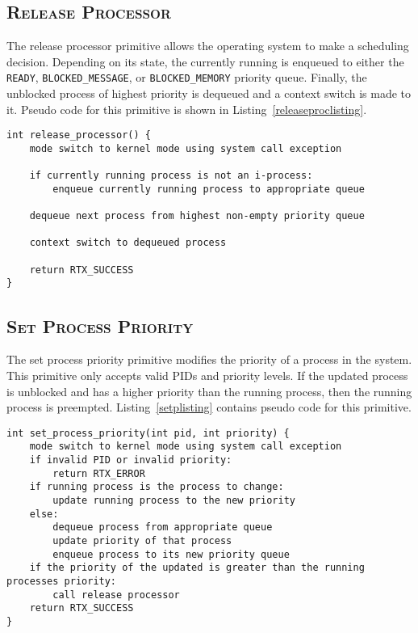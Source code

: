 \documentclass[oneside]{report}
\begin{document}
\subsection{\textsc{Release Processor}}
The release processor primitive allows the operating system to make a
scheduling decision. Depending on its state, the currently running is
enqueued to either the \texttt{READY}, \texttt{BLOCKED\_MESSAGE}, or
\texttt{BLOCKED\_MEMORY} priority queue. Finally, the unblocked process
of highest priority is dequeued and a context switch is made to it. Pseudo code 
for this primitive is shown in Listing~\ref{releaseproclisting}.

\begin{lstlisting}
int release_processor() {
    mode switch to kernel mode using system call exception

    if currently running process is not an i-process:
        enqueue currently running process to appropriate queue

    dequeue next process from highest non-empty priority queue

    context switch to dequeued process
    
    return RTX_SUCCESS
}
\end{lstlisting}

\subsection{\textsc{Set Process Priority}}

The set process priority primitive modifies the priority of a process
in the system. This primitive only accepts valid PIDs and priority
levels. If the updated process is unblocked and has a higher priority
than the running process, then the running process is
preempted. Listing~\ref{setplisting} contains pseudo code for this
primitive.

\begin{lstlisting}
int set_process_priority(int pid, int priority) {
    mode switch to kernel mode using system call exception
    if invalid PID or invalid priority:
        return RTX_ERROR
    if running process is the process to change:
        update running process to the new priority
    else:
        dequeue process from appropriate queue
        update priority of that process
        enqueue process to its new priority queue
    if the priority of the updated is greater than the running processes priority:
        call release processor
    return RTX_SUCCESS
}
\end{lstlisting}
\end{document}
